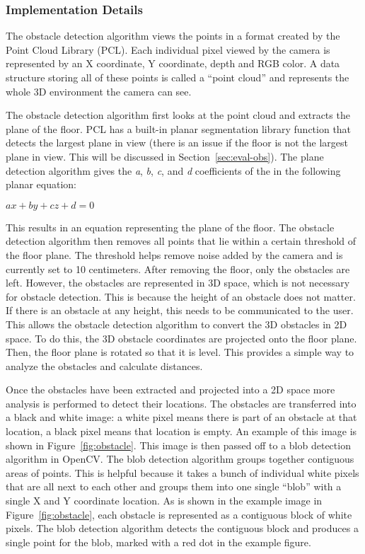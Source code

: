\subsubsection{Implementation Details}
\label{sec:technical-obs-impl}

The obstacle detection algorithm views the points in a format created by the
Point Cloud Library (PCL)\cite{pcl-website}. Each individual pixel viewed by
the camera is represented by an X coordinate, Y coordinate, depth and RGB color.
A data structure storing all of these points is called a ``point cloud'' and
represents the whole 3D environment the camera can see.

The obstacle detection algorithm first looks at the point cloud and extracts the
plane of the floor. PCL has a built-in planar segmentation library function that
detects the largest plane in view (there is an issue if the floor is not the
largest plane in view. This will be discussed in Section~\ref{sec:eval-obs}).
The plane detection algorithm gives the \emph{a}, \emph{b}, \emph{c}, and
\emph{d} coefficients of the in the following planar equation:

\begin{math}
ax + by + cz + d = 0
\end{math}

This results in an equation representing the plane of the floor. The obstacle
detection algorithm then removes all points that lie within a certain threshold
of the floor plane. The threshold helps remove noise added by the camera and is
currently set to 10 centimeters. After removing the floor, only the obstacles
are left. However, the obstacles are represented in 3D space, which is not
necessary for obstacle detection. This is because the height of an obstacle does
not matter. If there is an obstacle at any height, this needs to be
communicated to the user. This allows the obstacle detection algorithm to
convert the 3D obstacles in 2D space. To do this, the 3D obstacle coordinates
are projected onto the floor plane. Then, the floor plane is rotated so that it
is level. This provides a simple way to analyze the obstacles and calculate
distances.

Once the obstacles have been extracted and projected into a 2D space more
analysis is performed to detect their locations. The obstacles are transferred
into a black and white image: a white pixel means there is part of an obstacle
at that location, a black pixel means that location is empty. An example of this
image is shown in Figure~\ref{fig:obstacle}. This image is then
passed off to a blob detection algorithm in OpenCV\cite{opencv-website}. The
blob detection algorithm groups together contiguous areas of points. This is
helpful because it takes a bunch of individual white pixels that are all next to
each other and groups them into one single ``blob'' with a single X and Y
coordinate location. As is shown in the example image in
Figure~\ref{fig:obstacle}, each obstacle is represented as a contiguous block
of white pixels. The blob detection algorithm detects the contiguous block and
produces a single point for the blob, marked with a red dot in the example
figure.

